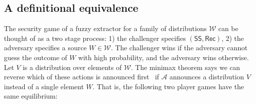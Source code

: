 \documentclass[11pt]{article}
\newcommand{\class}[1]{{\ensuremath{\mathsf{#1}}}}
\newcommand{\sketch}{\ensuremath{\class{SS}}\xspace}
\newcommand{\rec}{\ensuremath{\class{Rec}}\xspace}
\begin{document}
\subsection{A definitional equivalence}
\label{sec:def equiv}

The security game of a fuzzy extractor for a family of distributions $\mathcal{W}$ can be thought of as a two stage process: 1) the challenger specifies $(\sketch, \rec)$, 2) the adversary specifies a source $W\in \mathcal{W}$.  The challenger wins if the adversary cannot guess the outcome of $W$ with high probability, and the adversary wins otherwise.  Let $V$ is a distribution over elements of $\mathcal{W}$.  The minimax theorem says we can reverse which of these actions is announced first~\cite{neumann1928theorie} if $\mathcal{A}$ announces a distribution $V$ instead of a single element $W$.  That is, the following two player games have the same equilibrium:

\end{document}
